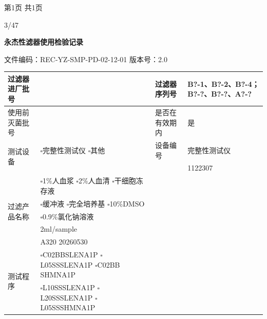 \documentclass[UTF8,10pt,a4paper,fontset=fandol]{ctexart}
\newcommand{\fieldvalue}[1]{#1}
\newcommand{\handwritten}[1]{#1}
\begin{document}
\normalsize
\begin{center}
第1页 共1页
\end{center}

\handwritten{3/47}

\newpage

\begin{center}
\textbf{永杰性滤器使用检验记录}
\end{center}

\noindent
文件编码：REC-YZ-SMP-PD-02-12-01 \hfill 版本号：2.0

\begin{tabularx}{\textwidth}{|p{2.5cm}|X|p{2.5cm}|X|}
\hline
过滤器进厂批号
&
{}
&
过滤器序列号
&
\fieldvalue{\handwritten{B?-1、B?-2、B?-4；B?-?、B?-?、A?-?}}
\\
\hline
使用前灭菌批号
&
{}
&
是否在有效期内
&
\fieldvalue{是}
\\
\hline
\multirow{2}{*}{测试设备}
&
$\square$完整性测试仪\quad
$\square$其他
&
设备编号
&
\fieldvalue{完整性测试仪}
\\
\cline{3-4}
&
&
&
\fieldvalue{1122307}
\\
\hline
\multirow{5}{*}{过滤产品名称}
&
$\square$1\%人血浆\quad
$\square$2\%人血清\quad
$\square$干细胞冻存液
&
&
\\
&
$\square$缓冲液\quad
$\square$完全培养基\quad
$\square$10\%DMSO
&
&
\\
&
$\square$0.9\%氯化钠溶液
&
&
\\
&
\fieldvalue{\handwritten{2ml/sample}}
&
&
\\
\hline
过滤产品批号
&
\fieldvalue{\handwritten{A320 20260530}}
&
&
\\
\hline
\multirow{4}{*}{测试程序}
&
$\square$C02BBSLENA1P\quad
$\square$L05SSSLENA1P\quad
$\square$C02BB SHMNA1P
&
&
\\
&
$\square$L10SSSLENA1P\quad
$\square$L20SSSLENA1P\quad
$\square$L05SSSHMNA1P
&
&
\\

\end{tabularx}
\end{document}
